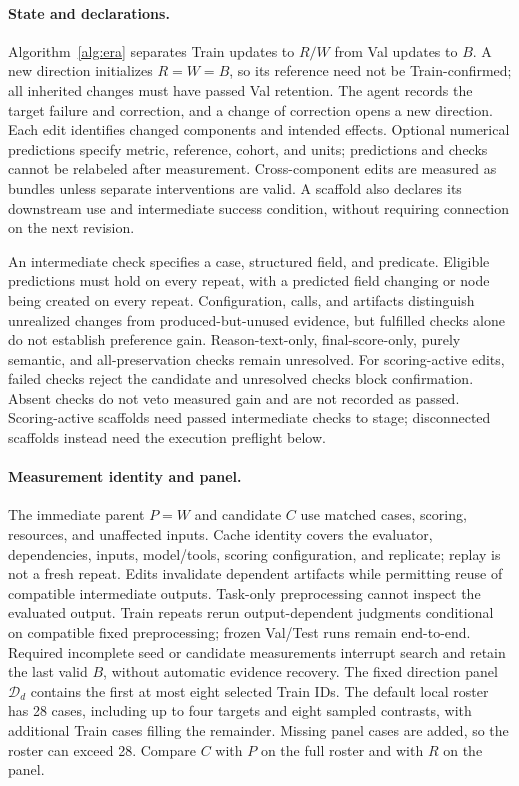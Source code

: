 \paragraph{State and declarations.}
Algorithm~\ref{alg:era} separates Train updates to $R/W$ from Val updates to $B$.
A new direction initializes $R=W=B$, so its reference need not be Train-confirmed; all inherited changes must have passed Val retention.
The agent records the target failure and correction, and a change of correction opens a new direction.
Each edit identifies changed components and intended effects.
Optional numerical predictions specify metric, reference, cohort, and units; predictions and checks cannot be relabeled after measurement.
Cross-component edits are measured as bundles unless separate interventions are valid.
A scaffold also declares its downstream use and intermediate success condition, without requiring connection on the next revision.

An intermediate check specifies a case, structured field, and predicate.
Eligible predictions must hold on every repeat, with a predicted field changing or node being created on every repeat.
Configuration, calls, and artifacts distinguish unrealized changes from produced-but-unused evidence, but fulfilled checks alone do not establish preference gain.
Reason-text-only, final-score-only, purely semantic, and all-preservation checks remain unresolved.
For scoring-active edits, failed checks reject the candidate and unresolved checks block confirmation.
Absent checks do not veto measured gain and are not recorded as passed.
Scoring-active scaffolds need passed intermediate checks to stage; disconnected scaffolds instead need the execution preflight below.

\paragraph{Measurement identity and panel.}
The immediate parent $P=W$ and candidate $C$ use matched cases, scoring, resources, and unaffected inputs.
Cache identity covers the evaluator, dependencies, inputs, model/tools, scoring configuration, and replicate; replay is not a fresh repeat.
Edits invalidate dependent artifacts while permitting reuse of compatible intermediate outputs.
Task-only preprocessing cannot inspect the evaluated output.
Train repeats rerun output-dependent judgments conditional on compatible fixed preprocessing; frozen Val/Test runs remain end-to-end.
Required incomplete seed or candidate measurements interrupt search and retain the last valid $B$, without automatic evidence recovery.
The fixed direction panel $\mathcal D_d$ contains the first at most eight selected Train IDs.
The default local roster has 28 cases, including up to four targets and eight sampled contrasts, with additional Train cases filling the remainder.
Missing panel cases are added, so the roster can exceed 28.
Compare $C$ with $P$ on the full roster and with $R$ on the panel.

